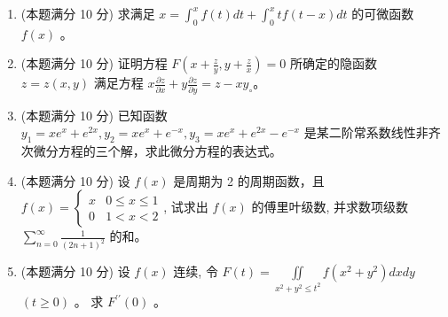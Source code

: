 \begin{enumerate}



\item 
(本题满分 10 分)
求满足 $x=\int_{0}^{x} f(t) d t + \int_{0}^{x} t f(t-x) d t$ 的可微函数 $f(x)$ 。



\item 
(本题满分 10 分)
证明方程 $F\left(x+\frac{z}{y}, y+\frac{z}{x}\right)=0$ 所确定的隐函数 $z=z(x, y)$ 满足方程 $x \frac{\partial z}{\partial x}+y \frac{\partial z}{\partial y}=z-x y_{\circ}$。




\newpage
\item 
(本题满分 10 分)
已知函数 $y_{1}=x e^{x}+e^{2 x}, y_{2}=x e^{x}+e^{-x}, y_{3}=x e^{x}+e^{2 x}-e^{-x}$ 是某二阶常系数线性非齐次微分方程的三个解，求此微分方程的表达式。





\item 
(本题满分 10 分)
设 $f(x)$ 是周期为 2 的周期函数，且 $f(x)=\left\{\begin{array}{ll}x & 0 \leqslant x \leqslant 1 \\ 0 & 1<x<2\end{array}\right.$, 试求出 $f(x)$ 的傅里叶级数,
并求数项级数 $\sum\limits_{n=0}^{\infty} \frac{1}{(2 n+1)^{2}}$ 的和。




\item 
(本题满分 10 分)
设 $f(x)$ 连续, 令 $F(t)=\iint\limits_{x^{2}+y^{2} \leqslant t^{2}} f\left(x^{2}+y^{2}\right) d x d y$ $(t \geqslant 0)$ 。 求 $F^{\prime \prime}(0)$ 。


\end{enumerate}
